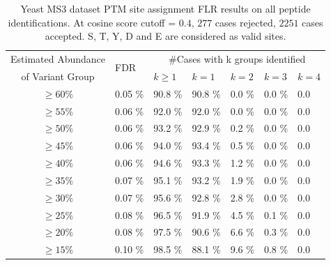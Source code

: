 \begin{table}[h]
  \centering
  \caption{Yeast MS3 dataset PTM site assignment FLR results on all peptide identifications. At cosine score cutoff = $0.4$, $277$ cases rejected, $2251$ cases accepted. S, T, Y, D and E are considered as valid sites.}\label{tbl:YeastFLR_all_STYDE}
\begin{tabular}{|c|l|l|l|l|l|l|}
\hline
Estimated Abundance & \multirow{2}{*}{FDR} & \multicolumn{5}{|c|}{\#Cases with k groups identified }\\
of Variant Group & & $k\ge 1$ & $k=1$ & $k=2$ & $k=3$  & $k=4$\\
\hline
$\ge	60	\%$ &	0.05	\% &	90.8	\% &	90.8	\% &	0.0	\% &	0.0	\% &	0.0	\\
$\ge	55	\%$ &	0.06	\% &	92.0	\% &	92.0	\% &	0.0	\% &	0.0	\% &	0.0	\\
$\ge	50	\%$ &	0.06	\% &	93.2	\% &	92.9	\% &	0.2	\% &	0.0	\% &	0.0	\\
$\ge	45	\%$ &	0.06	\% &	94.0	\% &	93.4	\% &	0.5	\% &	0.0	\% &	0.0	\\
$\ge	40	\%$ &	0.06	\% &	94.6	\% &	93.3	\% &	1.2	\% &	0.0	\% &	0.0	\\
$\ge	35	\%$ &	0.07	\% &	95.1	\% &	93.2	\% &	1.9	\% &	0.0	\% &	0.0	\\
$\ge	30	\%$ &	0.07	\% &	95.6	\% &	92.8	\% &	2.8	\% &	0.0	\% &	0.0	\\
$\ge	25	\%$ &	0.08	\% &	96.5	\% &	91.9	\% &	4.5	\% &	0.1	\% &	0.0	\\
$\ge	20	\%$ &	0.08	\% &	97.5	\% &	90.6	\% &	6.6	\% &	0.3	\% &	0.0	\\
$\ge	15	\%$ &	0.10	\% &	98.5	\% &	88.1	\% &	9.6	\% &	0.8	\% &	0.0	\\
\hline
\end{tabular}
\end{table}

